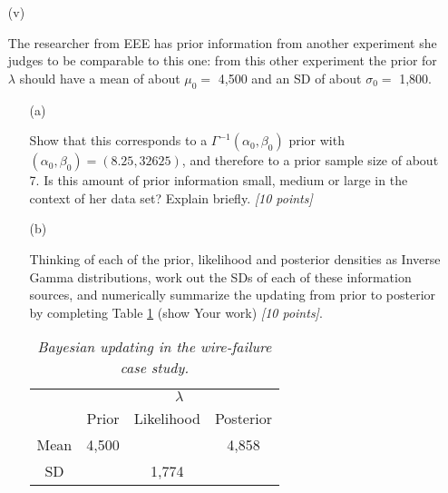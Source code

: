 \documentclass[12pt]{article}
\begin{document}
\begin{itemize}
\begin{itemize}
\item[(v)]

The researcher from EEE has prior information from another experiment she judges to be comparable to this one: from this other experiment the prior for $\lambda$ should have a mean of about $\mu_0 =$ 4,500 and an SD of about $\sigma_0 =$ 1,800.  

\begin{itemize}

\item[(a)] 

Show that this corresponds to a $\Gamma^{ -1 }( \alpha_0, \beta_0 )$
prior with $( \alpha_0, \beta_0 ) = ( 8.25, 32625 )$, and therefore to a
prior sample size of about 7. Is this amount of prior information small, medium or large in the context of her data set? Explain briefly. \textit{[10 points]}

\item[(b)] 

Thinking of each of the prior, likelihood and posterior densities as Inverse Gamma distributions, work out the SDs of each of these information sources, and numerically summarize 	the updating from prior to posterior by completing Table \ref{t:prior-likelihood-posterior} (show Your work) \textit{[10 points]}.

\bigskip

\begin{table}[t!]

\centering

\caption{\textit{Bayesian updating in the wire-failure case study.}}

\label{t:prior-likelihood-posterior}

\bigskip

\begin{tabular}{c|ccc}

\multicolumn{1}{c}{} & \multicolumn{3}{c}{$\lambda$} \\ \cline{2-4}

\multicolumn{1}{c}{} & Prior & Likelihood & Posterior \\

\hline

Mean & 4,500 & & 4,858 \\

SD & & 1,774 & \\

\end{tabular}

\end{table}


\end{itemize}
\end{itemize}
\end{itemize}
\end{document}
